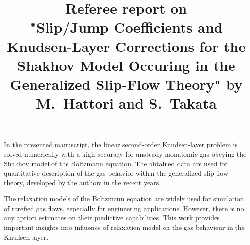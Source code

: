 \documentclass[11pt]{article}
\title{Referee report on \\ "Slip/Jump Coefficients and Knudsen-Layer Corrections for the Shakhov Model
    Occuring in the Generalized Slip-Flow Theory" by M.~Hattori and S.~Takata}
\date{}
\begin{document}
\maketitle

In the presented manuscript, the linear second-order Knudsen-layer problem is solved numerically with a high accuracy
for unsteady monatomic gas obeying the Shakhov model of the Boltzmann equation.
The obtained data are used for quantitative description of the gas behavior
within the generalized slip-flow theory, developed by the authors in the recent years.

The relaxation models of the Boltzmann equation are widely used for simulation of rarefied gas flows,
especially for engineering applications.
However, there is no any apriori estimates on their predictive capabilities.
This work provides important insights into influence of relaxation model on the gas behaviour in the Knudsen layer.
\end{document}
